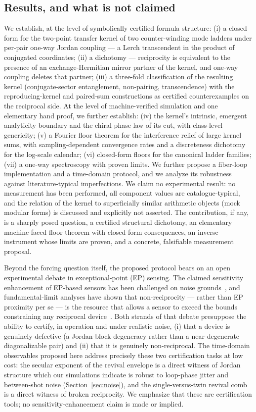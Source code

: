 \documentclass[11pt,a4paper]{article}
\begin{document}
\subsection{Results, and what is not claimed}

We establish, at the level of symbolically certified formula structure: (i) a
closed form for the two-point transfer kernel of two counter-winding mode
ladders under per-pair one-way Jordan coupling --- a Lerch transcendent in the
product of conjugated coordinates; (ii) a dichotomy --- reciprocity is equivalent
to the presence of an exchange-Hermitian mirror partner of the kernel, and
one-way coupling deletes that partner; (iii) a three-fold classification of the
resulting kernel (conjugate-sector entanglement, non-pairing, transcendence)
with the reproducing-kernel and paired-sum constructions as certified
counterexamples on the reciprocal side. At the level of machine-verified simulation and one elementary hand proof, we further establish: (iv) the kernel's intrinsic, emergent analyticity boundary and the chiral phase law of its cut, with class-level genericity; (v) a Fourier floor theorem for the interference relief of large kernel sums, with sampling-dependent convergence rates and a discreteness dichotomy for the log-scale calendar; (vi) closed-form floors for the canonical ladder families; (vii) a one-way spectroscopy with proven limits. We further propose a fiber-loop
implementation and a time-domain protocol, and we analyze its robustness
against literature-typical imperfections. We claim no experimental result: no
measurement has been performed, all component values are catalogue-typical, and
the relation of the kernel to superficially similar arithmetic objects (mock
modular forms) is discussed and explicitly not asserted. The contribution, if
any, is a sharply posed question, a certified structural dichotomy, an elementary machine-faced floor theorem with closed-form consequences, an inverse instrument whose limits are proven, and a
concrete, falsifiable measurement proposal.

Beyond the forcing question itself, the proposed protocol bears on an open
experimental debate in exceptional-point (EP) sensing. The claimed sensitivity
enhancement of EP-based sensors has been challenged on noise
grounds~\cite{Langbein2018,Wiersig2020}, and fundamental-limit analyses have
shown that non-reciprocity --- rather than EP proximity per se --- is the
resource that allows a sensor to exceed the bounds constraining any reciprocal
device~\cite{LauClerk2018}. Both strands of that debate presuppose the ability
to certify, in operation and under realistic noise, (i) that a device is
genuinely defective (a Jordan-block degeneracy rather than a near-degenerate
diagonalizable pair) and (ii) that it is genuinely non-reciprocal. The
time-domain observables proposed here address precisely these two
certification tasks at low cost: the secular exponent of the revival envelope
is a direct witness of Jordan structure which our simulations indicate is
robust to loop-phase jitter and between-shot noise (Section~\ref{sec:noise}),
and the single-versus-twin revival comb is a direct witness of broken
reciprocity. We emphasize that these are certification tools; no
sensitivity-enhancement claim is made or implied.
\end{document}
